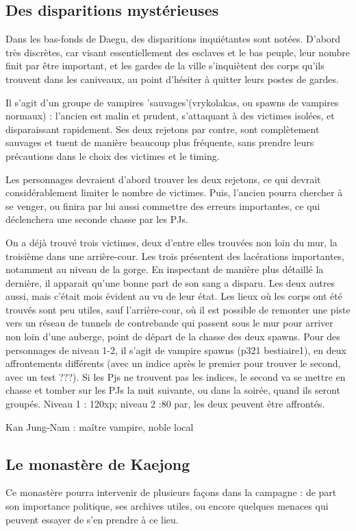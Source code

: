 \documentclass[10pt,a4paper]{book}
\begin{document}
\subsection{Des disparitions mystérieuses}
Dans les bas-fonds de Daegu, des disparitions inquiétantes sont notées. D'abord très discrètes, car visant essentiellement des esclaves et le bas peuple, leur nombre finit par être important, et les gardes de la ville s'inquiètent des corps qu'ils trouvent dans les caniveaux, au point d'hésiter à quitter leurs postes de gardes.

Il s'agit d'un groupe de vampires 'sauvages'(vrykolakas, ou spawns de vampires normaux) : l'ancien est malin et prudent, s'attaquant à des victimes isolées, et disparaissant rapidement. Ses deux rejetons par contre, sont complètement sauvages et tuent de manière beaucoup plus fréquente, sans prendre leurs précautions dans le choix des victimes et le timing.

Les personnages devraient d'abord trouver les deux rejetons, ce qui devrait considérablement limiter le nombre de victimes. Puis, l'ancien pourra chercher à se venger, ou finira par lui aussi commettre des erreurs importantes, ce qui déclenchera une seconde chasse par les PJs.

On a déjà trouvé trois victimes, deux d'entre elles trouvées non loin du mur, la troisième dans une arrière-cour. Les trois présentent des lacérations importantes, notamment au niveau de la gorge. En inspectant de manière plus détaillé la dernière, il apparait qu'une bonne part de son sang a disparu. Les deux autres aussi, mais c'était mois évident au vu de leur état. Les lieux où les corps ont été trouvés sont peu utiles, sauf l'arrière-cour, où il est possible de remonter une piste vers un réseau de tunnels de contrebande qui passent sous le mur pour arriver non loin d'une auberge, point de départ de la chasse des deux spawns. Pour des personnages de niveau 1-2, il s'agit de vampire spawns (p321 bestiaire1), en deux affrontements différents (avec un indice après le premier pour trouver le second, avec un test ???). Si les Pjs ne trouvent pas les indices, le second va se mettre en chasse et tomber sur les PJs la nuit suivante, ou dans la soirée, quand ils seront groupés. Niveau 1 : 120xp; niveau 2 :80 par, les deux peuvent être affrontés.

Kan Jung-Nam : maître vampire, noble local

\subsection{Le monastère de Kaejong}
Ce monastère pourra intervenir de plusieurs façons dans la campagne :
de part son importance politique, ses archives utiles, ou encore quelques menaces qui peuvent essayer de s'en prendre à ce lieu.
\end{document}
